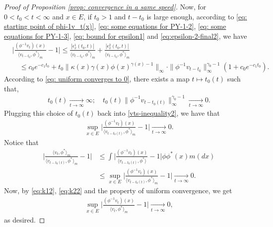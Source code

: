 \documentclass[UTF8]{pkuthss}
\theoremstyle{plain}
\theoremstyle{definition}
\numberwithin{equation}{section}
\begin{document}
\begin{proof}[Proof of Proposition \ref{prop: convergence in a same speed}]
	Now, for $0<t_0<t<\infty$ and $x\in E$, if $t_0 > 1$ and $t-t_0$ is large enough, according to \eqref{eq: starting point of phi-1v_t(x)}, \eqref{eq: some equations for PY-1-2}, \eqref{eq: some equations for PY-1-3}, \eqref{eq: bound for epsilon1} and \eqref{eq:epsilon-2-final2}, we have
\begin{align} \label{vts-inequality2}
	&\Big|\frac{(\phi^{-1}v_t)(x)}{\langle v_{t-t_0},\phi^* \rangle_m}-1 \Big|
	\leq \frac{|\epsilon_x^1(t_0,t)|}{\langle v_{t-t_0},\phi^* \rangle_m} + \frac{|\epsilon_x^2(t_0,t)|}{\langle v_{t-t_0},\phi^* \rangle_m}\\
	&\quad \leq c_0e^{-c_1 t_0} +t_0\|\kappa(x)\gamma(x)\phi(x)^{\gamma(x) - 1}\|_{\infty}
	\cdot \|\phi^{-1}v_{t-t_0}\|^{\gamma_0-1}_\infty (1+c_0 e^{-c_1 t_0}).
\end{align}
	According to \eqref{eq: uniform converges to 0}, there exists a map $t\mapsto t_0(t)$ such that,
\begin{align}
	t_0(t)
	\xrightarrow[t\to\infty]{} \infty;
	\quad t_0(t)\| \phi^{-1}v_{t-t_0(t)}\|^{\gamma_0 - 1}_\infty
	\xrightarrow[t\to\infty]{} 0.
\end{align}
	Plugging this choice of $t_0(t)$ back into \eqref{vts-inequality2}, we have that
\begin{align}\label{eq:k12}
	\sup_{x\in E}\Big|\frac{(\phi^{-1}v_t)(x)}{\langle v_{t-t_0(t)},\phi^* \rangle_m}-1 \Big|
	\xrightarrow[t\to\infty]{} 0.
\end{align}
	Notice that
\begin{align}\label{eq:k22}
	\Big |\frac {\langle v_t, \phi^*\rangle_m} {\langle v_{t-t_0(t)} , \phi^*\rangle_m} - 1 \Big |
	&\leq \int \Big | \frac{(\phi^{-1}v_t)(x)}{\langle v_{t-t_0(t)} , \phi^*\rangle} - 1 \Big| \phi \phi^*(x) m(dx)\\
	&\leq \sup_{x\in E}\Big|\frac{(\phi^{-1}v_t)(x)}{\langle v_{t-t_0(t)},\phi^* \rangle_m}-1 \Big|
	\xrightarrow[t\to\infty]{} 0.
\end{align}
	Now, by \eqref{eq:k12}, \eqref{eq:k22} and the property of uniform convergence, we get
\begin{align}
	\sup_{x\in E}\Big|\frac{(\phi^{-1}v_t)(x)}{\langle v_{t},\phi^* \rangle_m}-1 \Big|
	\xrightarrow[t\to\infty]{} 0,
\end{align}
	as desired.
\end{proof}
\end{document}
